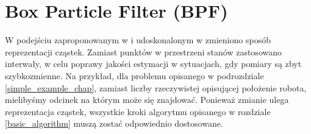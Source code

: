 \section{Box Particle Filter (BPF)} \label{bpf_chapter}
W podejściu zaproponowanym w \cite{bpf_base} i udoskonalonym w \cite{brbpf} zmieniono sposób reprezentacji cząstek. Zamiast punktów w przestrzeni stanów zastosowano interwały, w celu poprawy jakości estymacji w sytuacjach, gdy pomiary są zbyt szybkozmienne. Na przykład, dla problemu opisanego w podrozdziale \ref{simple_example_chap}, zamiast liczby rzeczywistej opisującej położenie robota, mielibyśmy odcinek na którym może się znajdować. Ponieważ zmianie ulega reprezentacja cząstek, wszystkie kroki algorytmu opisanego w rozdziale \ref{basic_algorithm} muszą zostać odpowiednio dostosowane.
